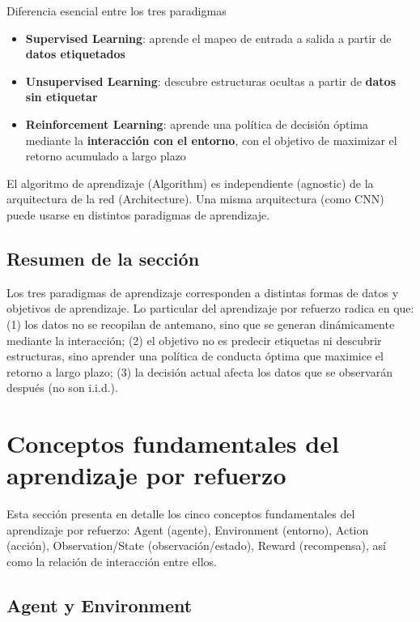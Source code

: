 \documentclass[a4paper]{article}
\begin{document}
\begin{importantbox}{Diferencia esencial entre los tres paradigmas}
\begin{itemize}
    \item \textbf{Supervised Learning}: aprende el mapeo de entrada a salida a partir de \textbf{datos etiquetados}
    \item \textbf{Unsupervised Learning}: descubre estructuras ocultas a partir de \textbf{datos sin etiquetar}
    \item \textbf{Reinforcement Learning}: aprende una política de decisión óptima mediante la \textbf{interacción con el entorno}, con el objetivo de maximizar el retorno acumulado a largo plazo
\end{itemize}
El algoritmo de aprendizaje (Algorithm) es independiente (agnostic) de la arquitectura de la red (Architecture). Una misma arquitectura (como CNN) puede usarse en distintos paradigmas de aprendizaje.
\end{importantbox}

\subsection{Resumen de la sección}
Los tres paradigmas de aprendizaje corresponden a distintas formas de datos y objetivos de aprendizaje. Lo particular del aprendizaje por refuerzo radica en que: (1) los datos no se recopilan de antemano, sino que se generan dinámicamente mediante la interacción; (2) el objetivo no es predecir etiquetas ni descubrir estructuras, sino aprender una política de conducta óptima que maximice el retorno a largo plazo; (3) la decisión actual afecta los datos que se observarán después (no son i.i.d.).


\section{Conceptos fundamentales del aprendizaje por refuerzo}

Esta sección presenta en detalle los cinco conceptos fundamentales del aprendizaje por refuerzo: Agent (agente), Environment (entorno), Action (acción), Observation/State (observación/estado), Reward (recompensa), así como la relación de interacción entre ellos.

\subsection{Agent y Environment}
\end{document}
